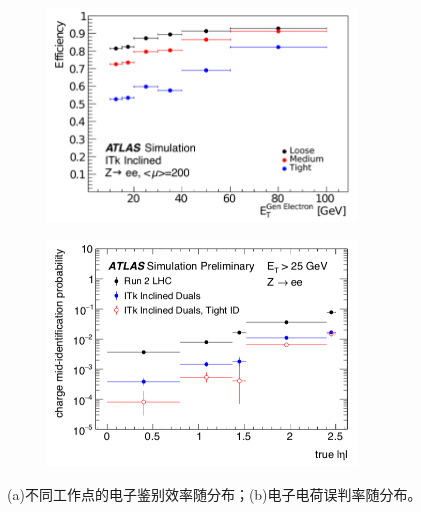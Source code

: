 \begin{figure}[h]
\centering
\begin{subfigure}[b]{0.45\textwidth}
\centering
 \includegraphics[width=0.9\textwidth]{fig/ITk_ele_qmisid1.png}
 \caption{}
\end{subfigure}
\begin{subfigure}[b]{0.45\textwidth}
\centering
 \includegraphics[width=0.9\textwidth]{fig/ITk_ele_qmisid2.png}
 \caption{}
\end{subfigure}
\caption{(a)不同工作点的电子鉴别效率随\et 分布；(b)电子电荷误判率随\abseta 分布。\cite{ATL-PHYS-PUB-2019-005}}
\label{fig:ITk_ele_qmisid}
\end{figure}

